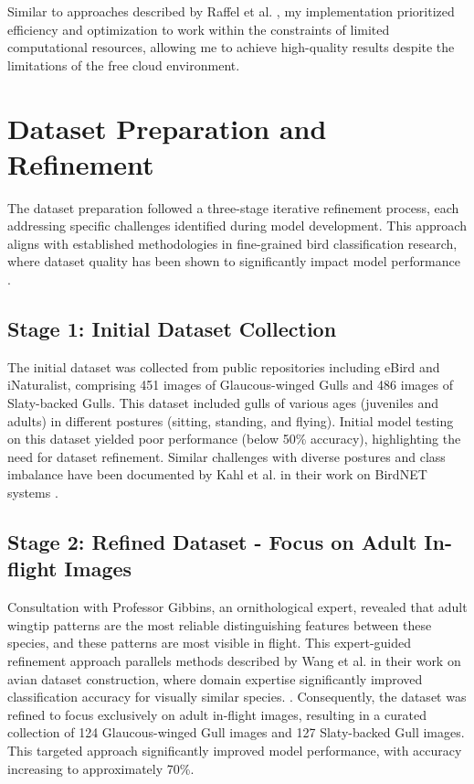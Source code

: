 \documentclass[a4paper,12pt]{article}
\begin{document}
Similar to approaches described by Raffel et al. \citet{raffel2023}, my implementation prioritized efficiency and optimization to work within the constraints of limited computational resources, allowing me to achieve high-quality results despite the limitations of the free cloud environment.

\section{Dataset Preparation and Refinement}

The dataset preparation followed a three-stage iterative refinement process, each addressing specific challenges identified during model development. This approach aligns with established methodologies in fine-grained bird classification research, where dataset quality has been shown to significantly impact model performance \citet{ghani2024}.

\subsection{Stage 1: Initial Dataset Collection}

The initial dataset was collected from public repositories including eBird and iNaturalist, comprising 451 images of Glaucous-winged Gulls and 486 images of Slaty-backed Gulls. This dataset included gulls of various ages (juveniles and adults) in different postures (sitting, standing, and flying). Initial model testing on this dataset yielded poor performance (below 50\% accuracy), highlighting the need for dataset refinement. Similar challenges with diverse postures and class imbalance have been documented by Kahl et al. in their work on BirdNET systems \citet{kahl2021}.




\subsection{Stage 2: Refined Dataset - Focus on Adult In-flight Images}

Consultation with Professor Gibbins, an ornithological expert, revealed that adult wingtip patterns are the most reliable distinguishing features between these species, and these patterns are most visible in flight. This expert-guided refinement approach parallels methods described by Wang et al. in their work on avian dataset construction, where domain expertise significantly improved classification accuracy for visually similar species. \citet{wang2022}. Consequently, the dataset was refined to focus exclusively on adult in-flight images, resulting in a curated collection of 124 Glaucous-winged Gull images and 127 Slaty-backed Gull images. This targeted approach significantly improved model performance, with accuracy increasing to approximately 70\%.
\end{document}
